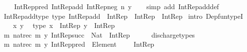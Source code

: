 \begin{isabellebody}
\ \ \ \ Int{\isacharunderscore}{\kern0pt}Rep{\isacharunderscore}{\kern0pt}pred\ {\isacharparenleft}{\kern0pt}Int{\isacharunderscore}{\kern0pt}Rep{\isacharunderscore}{\kern0pt}add\ {\isacharparenleft}{\kern0pt}Int{\isacharunderscore}{\kern0pt}Rep{\isacharunderscore}{\kern0pt}neg\ n{\isacharparenright}{\kern0pt}\ y{\isacharparenright}{\kern0pt}{\isachardoublequoteclose}\isanewline
%
\isadelimproof
\ \ %
\endisadelimproof
%
\isatagproof
{}\isamarkupfalse%
\ {\isacharparenleft}{\kern0pt}simp\ add{\isacharcolon}{\kern0pt}\ Int{\isacharunderscore}{\kern0pt}Rep{\isacharunderscore}{\kern0pt}add{\isacharunderscore}{\kern0pt}def{\isacharparenright}{\kern0pt}%
\endisatagproof
{\isafoldproof}%
%
\isadelimproof
\isanewline
%
\endisadelimproof
\isanewline
{}\isamarkupfalse%
\ Int{\isacharunderscore}{\kern0pt}Rep{\isacharunderscore}{\kern0pt}add{\isacharunderscore}{\kern0pt}type\ {\isacharbrackleft}{\kern0pt}type{\isacharbrackright}{\kern0pt}{\isacharcolon}{\kern0pt}\ {\isachardoublequoteopen}Int{\isacharunderscore}{\kern0pt}Rep{\isacharunderscore}{\kern0pt}add\ {\isacharcolon}{\kern0pt}\ Int{\isacharunderscore}{\kern0pt}Rep\ {\isasymRightarrow}\ Int{\isacharunderscore}{\kern0pt}Rep\ {\isasymRightarrow}\ Int{\isacharunderscore}{\kern0pt}Rep{\isachardoublequoteclose}\isanewline
%
\isadelimproof
%
\endisadelimproof
%
\isatagproof
{}\isamarkupfalse%
\ {\isacharparenleft}{\kern0pt}intro\ Dep{\isacharunderscore}{\kern0pt}fun{\isacharunderscore}{\kern0pt}typeI{\isacharparenright}{\kern0pt}\isanewline
\isanewline
\ \ \isamarkupfalse%
\ x\ y\ \isamarkupfalse%
\ {\isacharbrackleft}{\kern0pt}type{\isacharbrackright}{\kern0pt}{\isacharcolon}{\kern0pt}\ {\isachardoublequoteopen}x\ {\isacharcolon}{\kern0pt}\ Int{\isacharunderscore}{\kern0pt}Rep{\isachardoublequoteclose}\ {\isachardoublequoteopen}y\ {\isacharcolon}{\kern0pt}\ Int{\isacharunderscore}{\kern0pt}Rep{\isachardoublequoteclose}\isanewline
\ \ \isamarkupfalse%
\ {\isachardoublequoteopen}{\isacharparenleft}{\kern0pt}{\isasymlambda}m{\isachardot}{\kern0pt}\ nat{\isacharunderscore}{\kern0pt}rec\ m\ y\ Int{\isacharunderscore}{\kern0pt}Rep{\isacharunderscore}{\kern0pt}succ{\isacharparenright}{\kern0pt}\ {\isacharcolon}{\kern0pt}\ Nat\ {\isasymRightarrow}\ Int{\isacharunderscore}{\kern0pt}Rep{\isachardoublequoteclose}\isanewline
\ \ \ \ \isamarkupfalse%
\ discharge{\isacharunderscore}{\kern0pt}types\isanewline
\ \ \isamarkupfalse%
\ \isamarkupfalse%
\ {\isachardoublequoteopen}{\isacharparenleft}{\kern0pt}{\isasymlambda}m{\isachardot}{\kern0pt}\ nat{\isacharunderscore}{\kern0pt}rec\ m\ y\ Int{\isacharunderscore}{\kern0pt}Rep{\isacharunderscore}{\kern0pt}pred{\isacharparenright}{\kern0pt}\ {\isacharcolon}{\kern0pt}\ Element\ {\isacharparenleft}{\kern0pt}{\isasymnat}\ {\isasymsetminus}\ {\isacharbraceleft}{\kern0pt}{}{\isacharbraceright}{\kern0pt}{\isacharparenright}{\kern0pt}\ {\isasymRightarrow}\ Int{\isacharunderscore}{\kern0pt}Rep{\isachardoublequoteclose}\isanewline

\end{isabellebody}
